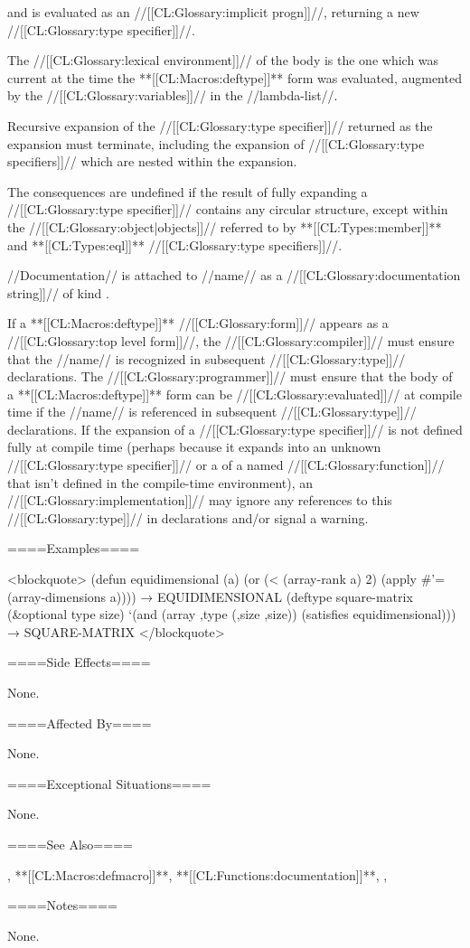 and is evaluated as an //[[CL:Glossary:implicit progn]]//, returning a new //[[CL:Glossary:type specifier]]//.

The //[[CL:Glossary:lexical environment]]// of the body is the one which was current at the time the **[[CL:Macros:deftype]]** form was evaluated, augmented by the //[[CL:Glossary:variables]]// in the //lambda-list//.

Recursive expansion of the //[[CL:Glossary:type specifier]]// returned as the expansion must terminate, including the expansion of //[[CL:Glossary:type specifiers]]// which are nested within the expansion.

The consequences are undefined if the result of fully expanding a //[[CL:Glossary:type specifier]]// contains any circular structure, except within the //[[CL:Glossary:object|objects]]// referred to by **[[CL:Types:member]]** and **[[CL:Types:eql]]** //[[CL:Glossary:type specifiers]]//.

//Documentation// is attached to //name// as a //[[CL:Glossary:documentation string]]// of kind .

If a **[[CL:Macros:deftype]]** //[[CL:Glossary:form]]// appears as a //[[CL:Glossary:top level form]]//, the //[[CL:Glossary:compiler]]// must ensure that the //name// is recognized in subsequent //[[CL:Glossary:type]]// declarations. The //[[CL:Glossary:programmer]]// must ensure that the body of a **[[CL:Macros:deftype]]** form can be //[[CL:Glossary:evaluated]]// at compile time if the //name// is referenced in subsequent //[[CL:Glossary:type]]// declarations. If the expansion of a //[[CL:Glossary:type specifier]]// is not defined fully at compile time (perhaps because it expands into an unknown //[[CL:Glossary:type specifier]]// or a  of a named //[[CL:Glossary:function]]// that isn't defined in the compile-time environment), an //[[CL:Glossary:implementation]]// may ignore any references to this //[[CL:Glossary:type]]// in declarations and/or signal a warning.

====Examples====

<blockquote> (defun equidimensional (a) (or (< (array-rank a) 2) (apply #'= (array-dimensions a)))) → EQUIDIMENSIONAL (deftype square-matrix (&optional type size) `(and (array ,type (,size ,size)) (satisfies equidimensional))) → SQUARE-MATRIX </blockquote>

====Side Effects====

None.

====Affected By====

None.

====Exceptional Situations====

None.

====See Also====

, **[[CL:Macros:defmacro]]**, **[[CL:Functions:documentation]]**, {\secref\TypeSpecifiers}, {\secref\DocVsDecls}

====Notes====

None.

     
